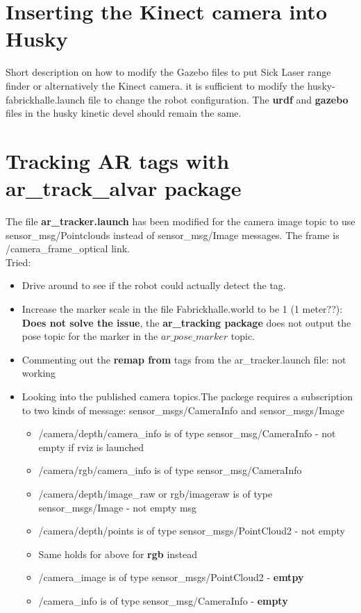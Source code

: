 \documentclass[11pt,a4paper]{article}
\begin{document}

%
%




\section{Inserting the Kinect camera into Husky}
Short description on how to modify the Gazebo files to put Sick Laser range finder or alternatively the Kinect camera. it is sufficient to modify the husky-fabrickhalle.launch file to change the robot configuration. The \textbf{urdf} and \textbf{gazebo} files in the husky kinetic devel should remain the same. \\




\section{Tracking AR tags with ar{\_}track{\_}alvar package} \label{sec:ar}

The file \textbf{ar{\_}tracker.launch} has been modified for the camera image topic to use sensor{\_}msg/Pointclouds instead of sensor{\_}msg/Image messages. The frame is /camera{\_}frame{\_}optical link. \\
Tried:
\begin{itemize}
\item Drive around to see if the robot could actually detect the tag.
\item Increase the marker scale in the file Fabrickhalle.world to be 1 (1 meter??): \textbf{Does not solve the issue}, the \textbf{ar{\_}tracking package} does not output the pose topic for the marker in the $ar{\_}pose{\_}marker$ topic.
\item Commenting out the \textbf{remap from} tags from the ar{\_}tracker.launch  file: not working
\item Looking into the published camera topics.The packege requires a subscription to two kinds of message: sensor{\_}msgs/CameraInfo and sensor{\_}msgs/Image
\begin{itemize}
\item /camera/depth/camera{\_}info is of type sensor{\_}msg/CameraInfo - not empty if rviz is launched
\item /camera/rgb/camera{\_}info is of type sensor{\_}msg/CameraInfo
\item /camera/depth/image{\_}raw or rgb/imageraw is of type sensor{\_}msgs/Image - not empty msg
\item /camera/depth/points is of type sensor{\_}msgs/PointCloud2 - not empty
\item Same holds for above for \textbf{rgb} instead
\item /camera{\_}image is of type sensor{\_}msgs/PointCloud2 - \textbf{emtpy}
\item /camera{\_}info is of type sensor{\_}msg/CameraInfo - \textbf{empty}
\end{itemize}
\end{itemize}
\end{document}
